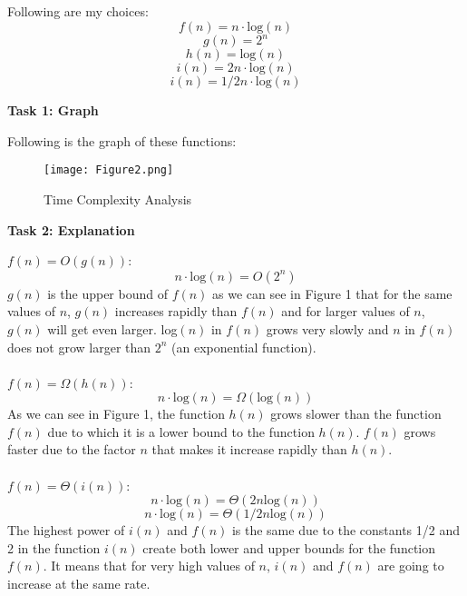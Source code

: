 \documentclass[a4paper]{exam}
\begin{document}
\begin{questions}
  \begin{solution}
    Following are my choices:
    \[ f(n) = n\cdot \text{log}(n) \]
    \[ g(n) = 2^n \]
    \[ h(n) = \text{log}(n) \]
    \[ i(n) = 2n\cdot \text{log}(n) \]
    \[ i(n) = 1/2n\cdot \text{log}(n) \]
    \begin{center}
        \textbf{Task 1: Graph}
    \end{center}
    Following is the graph of these functions:
    \begin{figure}[H]
        \centering
        \texttt{[image: Figure2.png]}
        \caption{Time Complexity Analysis}
        \label{fig:my_label}
    \end{figure}
    \begin{center}
    \textbf{Task 2: Explanation}
\end{center}
\underline{$f(n) = O(g(n))$}:
\[ n\cdot \text{log}(n) = O(2^n) \]
$g(n)$ is the upper bound of $f(n)$ as we can see in Figure 1 that for the same values of $n$, $g(n)$ increases rapidly than $f(n)$ and for larger values of $n$, $g(n)$ will get even larger. log$(n)$ in $f(n)$ grows very slowly and $n$ in $f(n)$ does not grow larger than $2^n$ (an exponential function).\\ \\
\underline{$f(n) = \Omega (h(n))$}:
\[ n\cdot \text{log}(n) = \Omega (\text{log}(n)) \]
As we can see in Figure 1, the function $h(n)$ grows slower than the function $f(n)$ due to which it is a lower bound to the function $h(n)$. $f(n)$ grows faster due to the factor $n$ that makes it increase rapidly than $h(n)$. \\ \\
\underline{$f(n) = \Theta(i(n))$}:
\[ n\cdot \text{log}(n) = \Theta(2n\text{log}(n)) \]
\[ n\cdot \text{log}(n) = \Theta(1/2n\text{log}(n)) \]
The highest power of $i(n)$ and $f(n)$ is the same due to the constants 1/2 and 2 in the function $i(n)$ create both lower and upper bounds for the function $f(n)$. It means that for very high values of $n$, $i(n)$ and $f(n)$ are going to increase at the same rate. 

  \end{solution}

\end{questions}
\end{document}
